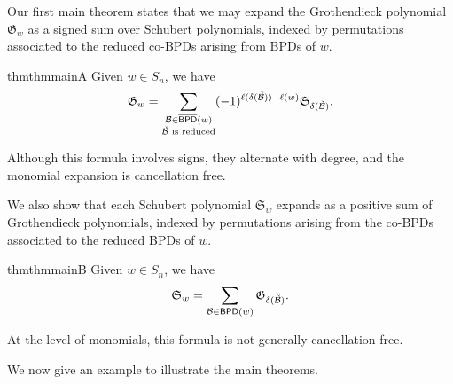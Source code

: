\documentclass[12 pt]{amsart}
\numberwithin{equation}{section}
\theoremstyle{remark}
\newcommand{\bpd}{{\sf BPD}}
\newcommand{\kbpd}{\overline{\sf BPD}}
\newcommand{\demprod}{\delta}
\begin{document}
	Our first main theorem states that we may expand the Grothendieck polynomial $\mathfrak{G}_w$ as a signed sum over Schubert polynomials, indexed by permutations associated to the reduced co-BPDs arising from BPDs of $w$. 
	\begin{restatable}{thm}{thmmainA}
		\label{thm:main1}
		Given $w \in S_n$, we have 
		\[\mathfrak{G}_w = \sum_{\substack{\mathcal{B} \in \kbpd(w)\\ \check{\mathcal{B}} \text{ is reduced}}} (-1)^{\ell(\demprod(\check{\mathcal{B}}))-\ell(w)} \mathfrak{S}_{\demprod(\check{\mathcal{B}})}.\]
	\end{restatable}
	Although this formula involves signs, they alternate with degree, and the monomial expansion is cancellation free. 
	
	We also show that each Schubert polynomial $\mathfrak{S}_w$ expands as a positive sum of Grothendieck polynomials, indexed by permutations arising from the co-BPDs associated to the reduced BPDs of $w$. 
	\begin{restatable}{thm}{thmmainB}
		\label{thm:main2}
		Given $w \in S_n$, we have 
		\[\mathfrak{S}_w = \sum_{\mathcal{B} \in \bpd(w)} \mathfrak{G}_{\demprod(\check{\mathcal{B}})}.\]
	\end{restatable}
	At the level of monomials, this formula is not generally cancellation free.

	We now give an example to illustrate the main theorems.
	
\end{document}
